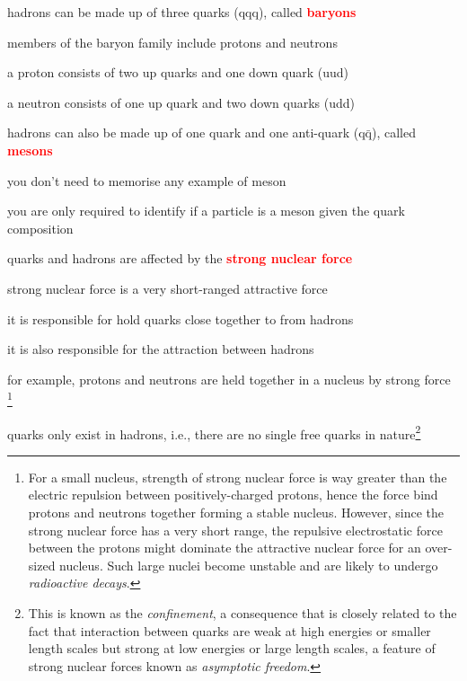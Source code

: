 \documentclass[a4paper,12pt]{book}
\newcounter{example}[chapter]
\newcommand{\cmt}{}
\newcommand{\keypoint}[1]{\textbf{\textcolor{red}{#1}}}
\newcommand{\keypoint}[1]{\textbf{\textcolor{red}{#1}}}
\newcommand{\cmt}{}
\begin{document}
\begin{compactenum}
	\item[--] hadrons can be made up of three quarks (qqq), called \keypoint{baryons} 
	
	members of the baryon family include protons and neutrons
	
	a proton consists of two up quarks and one down quark (uud) 
	
	a neutron consists of one up quark and two down quarks (udd) 
	
	\item[--] hadrons can also be made up of one quark and one anti-quark (q$\bar{\text{q}}$), called \keypoint{mesons} 
	
	you don't need to memorise any example of meson
	
	you are only required to identify if a particle is a meson given the quark composition
\end{compactenum}

\cmt quarks and hadrons are affected by the \keypoint{strong nuclear force}

strong nuclear force is a very short-ranged attractive force

\begin{compactenum}
	\item[--] it is responsible for hold quarks close together to from hadrons

	\item[--] it is also responsible for the attraction between hadrons
	
	for example, protons and neutrons are held together in a nucleus by strong force
	\footnote{For a small nucleus, strength of strong nuclear force is way greater than the electric repulsion between positively-charged protons, hence the force bind protons and neutrons together forming a stable nucleus. However, since the strong nuclear force has a very short range, the repulsive electrostatic force between the protons might dominate the attractive nuclear force for an over-sized nucleus. Such large nuclei become unstable and are likely to undergo \emph{radioactive decays}.}
\end{compactenum}

\cmt quarks only exist in hadrons, i.e., there are no single free quarks in nature\footnote{This is known as the \emph{confinement}, a consequence that is closely related to the fact that interaction between quarks are weak at high energies or smaller length scales but strong at low energies or large length scales, a feature of strong nuclear forces known as \emph{asymptotic freedom}.}
\end{document}
